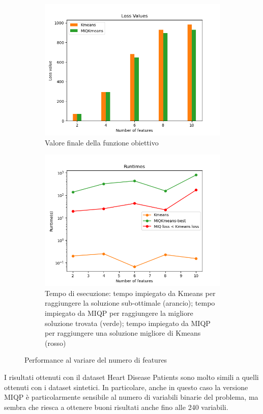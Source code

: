 \documentclass{article}
\begin{document}
    \begin{figure}[H]
     \centering
     \begin{subfigure}[t]{0.49\linewidth}
         \centering
         \includegraphics[width=\linewidth]{../results/log_plots/loss_features_heart}
         \caption{Valore finale della funzione obiettivo}
     \end{subfigure}
     \hfill
     \begin{subfigure}[t]{0.49\linewidth}
         \centering
         \includegraphics[width=\linewidth]{../results/log_plots/runtime_features_heart_log}
         \caption{Tempo di esecuzione: tempo impiegato da Kmeans per raggiungere la soluzione sub-ottimale (arancio); tempo impiegato da MIQP per raggiungere la migliore soluzione trovata (verde); tempo impiegato da MIQP per raggiungere una soluzione migliore di Kmeans (rosso)}
     \end{subfigure}
        \caption{Performance al variare del numero di features}
        \label{fig:f_real}
     \end{figure}
    I risultati ottenuti con il dataset Heart Disease Patients sono molto simili a quelli ottenuti con i dataset sintetici. In particolare, anche in questo caso la versione MIQP è particolarmente sensibile al numero di variabili binarie del problema, ma sembra che riesca a ottenere buoni risultati anche fino alle 240 variabili.
\end{document}
